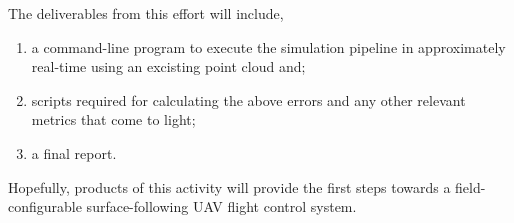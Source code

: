 \documentclass[doc]{apa6}
\begin{document}
The deliverables from this effort will include,

\begin{enumerate}
\item a command-line program to execute the simulation pipeline in approximately real-time using an excisting point cloud and;
\item scripts required for calculating the above errors and any other relevant metrics that come to light;
\item a final report.
\end{enumerate}

Hopefully, products of this activity will provide the first steps towards a field-configurable surface-following UAV flight control system.

\newpage

\printbibliography
\end{document}
